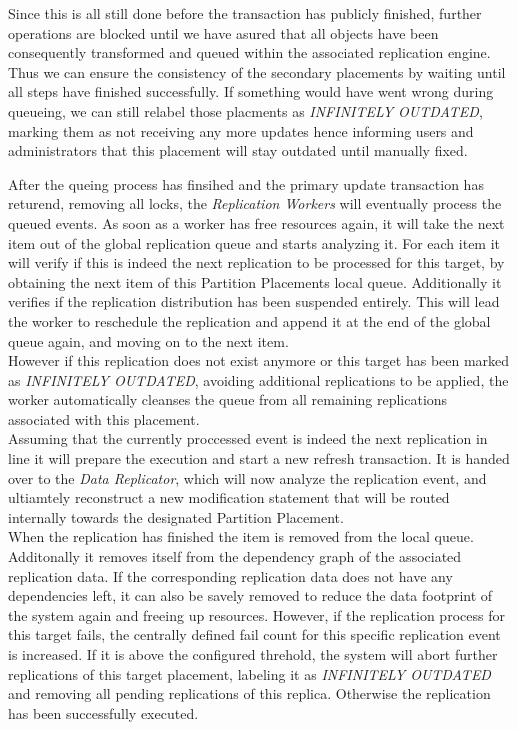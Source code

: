 Since this is all still done before the transaction has publicly finished, further operations are blocked until we have asured that all objects have been consequently 
transformed and queued within the associated replication engine. Thus we can ensure the consistency of the secondary placements by waiting until all steps have finished 
successfully. If something would have went wrong during queueing, we can still relabel those placments as \emph{INFINITELY OUTDATED}, marking them as not receiving any more updates 
hence informing users and administrators that this placement will stay outdated until manually fixed.

After the queing process has finsihed and the primary update transaction has returend, removing all locks, the \emph{Replication Workers} will eventually process the queued events.
As soon as a worker has free resources again, it will take the next item out of the global replication queue and starts analyzing it.
For each item it will verify if this is indeed the next replication to be processed for this target, by obtaining the next item of this Partition Placements local queue.
Additionally it verifies if the replication distribution has been suspended entirely. This will lead the worker to reschedule the replication
and append it at the end of the global queue again, and moving on to the next item.\\
However if this replication does not exist anymore or this target has been marked as \emph{INFINITELY OUTDATED}, avoiding additional replications to be applied,
the worker automatically cleanses the queue from all remaining replications associated with this placement.\\
Assuming that the currently proccessed event is indeed the next replication in line it will prepare the execution and start a new refresh transaction. 
It is handed over to the \emph{Data Replicator}, which will now analyze the replication event, and ultiamtely reconstruct a new modification statement that will be routed internally towards 
the designated Partition Placement.\\
When the replication has finished the item is removed from the local queue. Additonally it removes itself from the dependency graph of the associated replication data.
If the corresponding replication data does not have any dependencies left, it can also be savely removed to reduce the data footprint of the system again and freeing up resources.
However, if the replication process for this target fails, the centrally defined fail count for this specific replication event is increased. 
If it is above the configured threhold, the system will abort further replications of this target placement, labeling it as \emph{INFINITELY OUTDATED} and removing all pending
replications of this replica. Otherwise the replication has been successfully executed.

